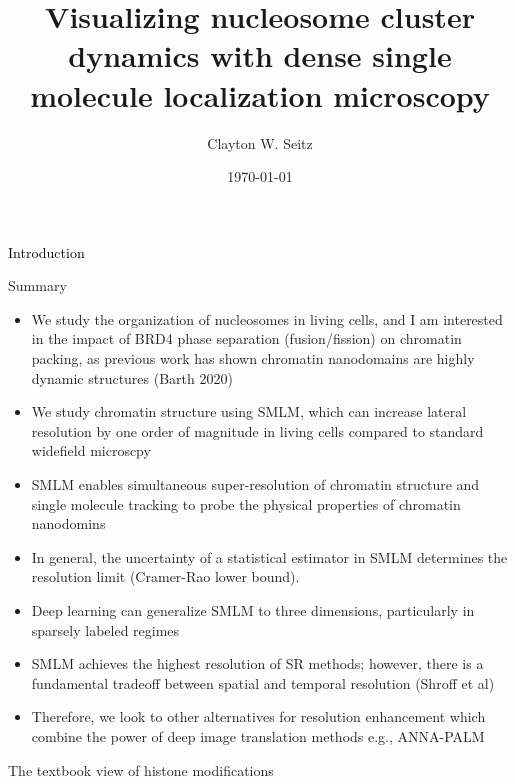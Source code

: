 \documentclass{beamer}					%
\title{Visualizing nucleosome cluster dynamics with dense single molecule localization microscopy}	%
\author{Clayton W. Seitz}								%
\date{\today}									%
\begin{document}
\begin{frame}
  \titlepage
\end{frame}


%


\begin{frame}
\frametitle{}
\centering
\Large \textcolor{black}{Introduction}
\end{frame}

\begin{frame}{Summary}
\begin{itemize}
\item We study the organization of nucleosomes in living cells, and I am interested in the impact of BRD4 phase separation (fusion/fission) on chromatin packing, as previous work has shown chromatin nanodomains are highly dynamic structures (Barth 2020)
\item We study chromatin structure using SMLM, which can increase lateral resolution by one order of magnitude in living cells compared to standard widefield microscpy
\item  SMLM enables simultaneous super-resolution of chromatin structure and single molecule tracking to probe the physical properties of chromatin nanodomins

\item In general, the uncertainty of a statistical estimator in SMLM determines the resolution limit (Cramer-Rao lower bound). \item Deep learning can generalize SMLM to three dimensions, particularly in sparsely labeled regimes

\item SMLM achieves the highest resolution of SR methods; however, there is a fundamental tradeoff between spatial and temporal resolution (Shroff et al)

\item Therefore, we look to other alternatives for resolution enhancement which combine the power of deep image translation methods e.g., ANNA-PALM
\end{itemize}
\end{frame}


\begin{frame}{The textbook view of histone modifications}

\end{frame}
\end{document}
